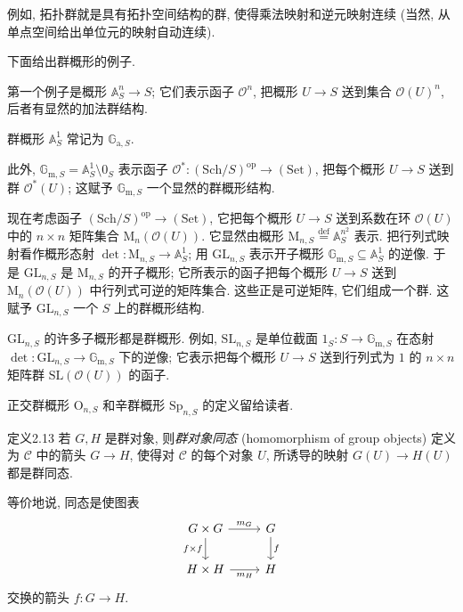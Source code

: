 例如, 拓扑群就是具有拓扑空间结构的群, 使得乘法映射和逆元映射连续 (当然, 从单点空间给出单位元的映射自动连续).

下面给出群概形的例子.

第一个例子是概形 $\mathbb A^n_S\to S$; 它们表示函子 $\mathcal O^n$, 把概形 $U\to S$ 送到集合 $\mathcal O(U)^n$, 后者有显然的加法群结构.

群概形 $\mathbb A^1_S$ 常记为 $\mathbb G_{\mathrm a,S}$.

此外, $\mathbb G_{\mathrm m,S}=\mathbb A^1_S\setminus0_S$ 表示函子 $\mathcal O^*:(\mathrm{Sch}/S)^{\mathrm{op}}\to(\mathrm{Set})$, 把每个概形 $U\to S$ 送到群 $\mathcal O^*(U)$; 这赋予 $\mathbb G_{\mathrm m,S}$ 一个显然的群概形结构.

现在考虑函子 $(\mathrm{Sch}/S)^{\mathrm{op}}\to(\mathrm{Set})$, 它把每个概形 $U\to S$ 送到系数在环 $\mathcal O(U)$ 中的 $n\times n$ 矩阵集合 $\mathrm M_n(\mathcal O(U))$. 它显然由概形 $\mathrm M_{n,S}\overset{\mathrm{def}}=\mathbb A_S^{n^2}$ 表示. 把行列式映射看作概形态射 $\det:\mathrm M_{n,S}\to\mathbb A^1_S$; 用 $\mathrm{GL}_{n,S}$ 表示开子概形 $\mathbb G_{\mathrm m,S}\subseteq\mathbb A^1_S$ 的逆像. 于是 $\mathrm{GL}_{n,S}$ 是 $\mathrm M_{n,S}$ 的开子概形; 它所表示的函子把每个概形 $U\to S$ 送到 $\mathrm M_n(\mathcal O(U))$ 中行列式可逆的矩阵集合. 这些正是可逆矩阵, 它们组成一个群. 这赋予 $\mathrm{GL}_{n,S}$ 一个 $S$ 上的群概形结构.

$\mathrm{GL}_{n,S}$ 的许多子概形都是群概形. 例如, $\mathrm{SL}_{n,S}$ 是单位截面 $1_S:S\to\mathbb G_{\mathrm m,S}$ 在态射 $\det:\mathrm{GL}_{n,S}\to\mathbb G_{\mathrm m,S}$ 下的逆像; 它表示把每个概形 $U\to S$ 送到行列式为 $1$ 的 $n\times n$ 矩阵群 $\mathrm{SL}(\mathcal O(U))$ 的函子.

正交群概形 $\mathrm O_{n,S}$ 和辛群概形 $\mathrm{Sp}_{n,S}$ 的定义留给读者.

\begin{origstatement}{定义}{2.13}\label{ch02:def213}
若 $G,H$ 是群对象, 则\emph{群对象同态} (homomorphism of group objects) 定义为 $\mathcal C$ 中的箭头 $G\to H$, 使得对 $\mathcal C$ 的每个对象 $U$, 所诱导的映射 $G(U)\to H(U)$ 都是群同态.
\end{origstatement}

等价地说, 同态是使图表
\[
\begin{tikzcd}
G\times G\arrow[r,"m_G"]\arrow[d,"f\times f"']&G\arrow[d,"f"]\\
H\times H\arrow[r,"m_H"']&H
\end{tikzcd}
\]
交换的箭头 $f:G\to H$.

